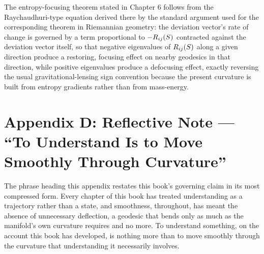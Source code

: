 The entropy-focusing theorem stated in Chapter 6 follows from the Raychaudhuri-type equation derived there by the standard argument used for the corresponding theorem in Riemannian geometry: the deviation vector's rate of change is governed by a term proportional to $-R_{ij}(S)$ contracted against the deviation vector itself, so that negative eigenvalues of $R_{ij}(S)$ along a given direction produce a restoring, focusing effect on nearby geodesics in that direction, while positive eigenvalues produce a defocusing effect, exactly reversing the usual gravitational-lensing sign convention because the present curvature is built from entropy gradients rather than from mass-energy.

\chapter*{Appendix D: Reflective Note --- ``To Understand Is to Move Smoothly Through Curvature''}

The phrase heading this appendix restates this book's governing claim in its most compressed form. Every chapter of this book has treated understanding as a trajectory rather than a state, and smoothness, throughout, has meant the absence of unnecessary deflection, a geodesic that bends only as much as the manifold's own curvature requires and no more. To understand something, on the account this book has developed, is nothing more than to move smoothly through the curvature that understanding it necessarily involves.
